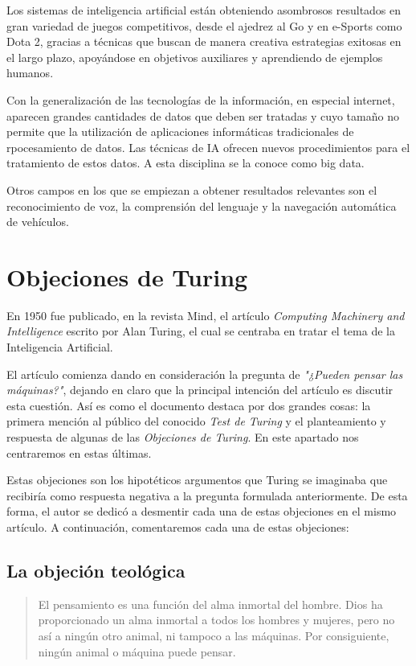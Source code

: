 \documentclass[12pt,a4paper]{article}
\begin{document}
Los sistemas de inteligencia artificial están obteniendo asombrosos resultados en gran variedad de juegos competitivos, desde el ajedrez al Go y en e-Sports como Dota 2, gracias a técnicas que buscan de manera creativa estrategias exitosas en el largo plazo, apoyándose en objetivos auxiliares y aprendiendo de ejemplos humanos.

Con la generalización de las tecnologías de la información, en especial internet, aparecen grandes cantidades de datos que deben ser tratadas y cuyo tamaño no permite que la utilización de aplicaciones informáticas tradicionales de rpocesamiento de datos. Las técnicas de IA ofrecen nuevos procedimientos para el tratamiento de estos datos. A esta disciplina se la conoce como big data.

Otros campos en los que se empiezan a obtener resultados relevantes son el reconocimiento de voz, la comprensión del lenguaje y la navegación automática de vehículos.

\section{Objeciones de Turing}
En 1950 fue publicado, en la revista Mind, el artículo \emph{Computing Machinery and Intelligence} escrito por Alan Turing, el cual se centraba en tratar el tema de la Inteligencia Artificial.

El artículo comienza dando en consideración la pregunta de \emph{"¿Pueden pensar las máquinas?"}, dejando en claro que la principal intención del artículo es discutir esta cuestión. Así es como el documento destaca por dos grandes cosas: la primera mención al público del conocido \emph{Test de Turing} y el planteamiento y respuesta de algunas de las \emph{Objeciones de Turing}. En este apartado nos centraremos en estas últimas.

Estas objeciones son los hipotéticos argumentos que Turing se imaginaba que recibiría como respuesta negativa a la pregunta formulada anteriormente. De esta forma, el autor se dedicó a desmentir cada una de estas objeciones en el mismo artículo. A continuación, comentaremos cada una de estas objeciones:

\subsection{La objeción teológica}

\begin{quote}\small El pensamiento es una función del alma inmortal del hombre. Dios ha proporcionado un alma inmortal a todos los hombres y mujeres, pero no así a ningún otro animal, ni tampoco a las máquinas. Por consiguiente, ningún animal o máquina puede pensar.\end{quote}
\end{document}

